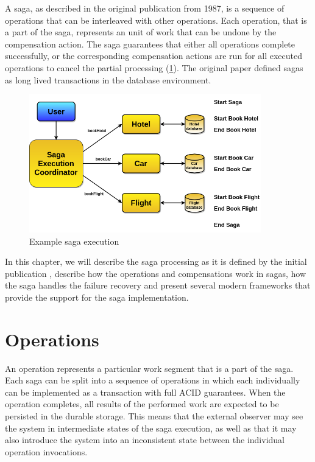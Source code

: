 \documentclass[oneside,
  digital, %
  table,   %
  lof,     %
  lot,     %
]{fithesis3}
\begin{document}
A saga, as described in the original publication \cite{sagas_publ} from 1987, is a sequence of operations that can be interleaved with other operations. Each operation, that is a part of the saga, represents an unit of work that can be undone by the compensation action. The saga guarantees that either all operations complete successfully, or the corresponding compensation actions are run for all executed operations to cancel the partial processing (\ref{fig:tripExample}). The original paper defined sagas as long lived transactions in the database environment.

\begin{figure}[h]
    \begin{center}
        \includegraphics[height=60mm]{images/tripExample.png}
    \end{center}
    \caption{Example saga execution}
    \label{fig:tripExample}
\end{figure}

In this chapter, we will describe the saga processing as it is defined by the initial publication \cite{sagas_publ}, describe how the operations and compensations work in sagas, how the saga handles the failure recovery and present several modern frameworks that provide the support for the saga implementation. 

\section{Operations}

An operation represents a particular work segment that is a part of the saga. Each saga can be split into a sequence of operations in which each individually can be implemented as a transaction with full ACID guarantees. When the operation completes, all results of the performed work are expected to be persisted in the durable storage. This means that the external observer may see the system in intermediate states of the saga execution, as well as that it may also introduce the system into an inconsistent state between the individual operation invocations.
\end{document}
